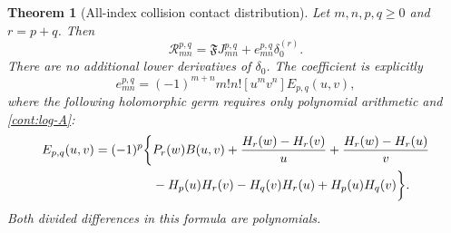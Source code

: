 \documentclass[11pt,a4paper]{article}
\newtheorem{theorem}{Theorem}[section]
\theoremstyle{definition}
\theoremstyle{remark}
\numberwithin{equation}{section}
\begin{document}
\begin{theorem}[All-index collision contact distribution]
\label{cont:main}
Let $m,n,p,q\ge0$ and $r=p+q$.  Then
\begin{equation}\label{cont:main-identity}
 \boxed{\mathcal R_{mn}^{p,q}
      =\mathfrak F J_{mn}^{p,q}+e_{mn}^{p,q}\delta_0^{(r)}}.
\end{equation}
There are no additional lower derivatives of $\delta_0$.
The coefficient is explicitly
\begin{equation}\label{cont:coefficient}
 e_{mn}^{p,q}=(-1)^{m+n}m!n![u^mv^n]E_{p,q}(u,v),
\end{equation}
where the following holomorphic germ requires only polynomial
arithmetic and \eqref{cont:log-A}:
\begin{align}
 E_{p,q}(u,v)=(-1)^p\bigg\{
 &P_r(w)B(u,v)
   +\frac{H_r(w)-H_r(v)}{u}
   +\frac{H_r(w)-H_r(u)}{v}\notag\\
 &-H_p(u)H_r(v)-H_q(v)H_r(u)+H_p(u)H_q(v)\bigg\}.
 \label{cont:E}
\end{align}
Both divided differences in this formula are polynomials.
\end{theorem}
\end{document}
